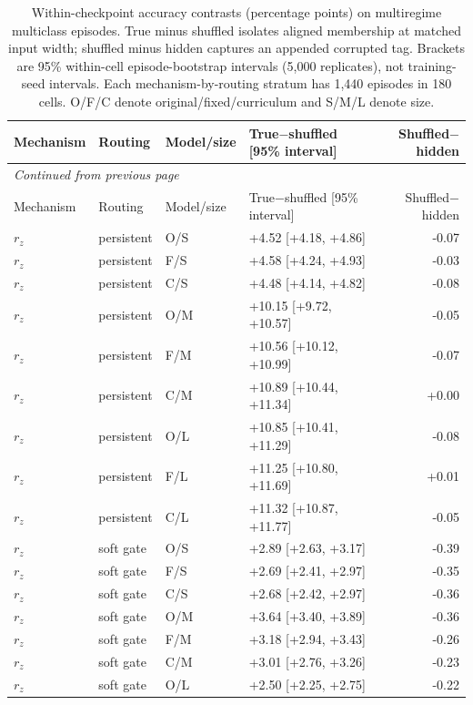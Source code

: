 \begin{longtable}{@{}lllp{4.4cm}r@{}}
\caption{Within-checkpoint accuracy contrasts (percentage points) on multiregime multiclass episodes. True minus shuffled isolates aligned membership at matched input width; shuffled minus hidden captures an appended corrupted tag. Brackets are 95\% within-cell episode-bootstrap intervals (5,000 replicates), not training-seed intervals. Each mechanism-by-routing stratum has 1,440 episodes in 180 cells. O/F/C denote original/fixed/curriculum and S/M/L denote size.}\label{tab:tagaccuracy}\\
\toprule Mechanism & Routing & Model/size & True$-$shuffled [95\% interval] & Shuffled$-$hidden\\\midrule\endfirsthead
\multicolumn{5}{l}{\emph{Continued from previous page}}\\\toprule Mechanism & Routing & Model/size & True$-$shuffled [95\% interval] & Shuffled$-$hidden\\\midrule\endhead
\bottomrule\endfoot
$r_z$ & persistent & O/S & +4.52 [+4.18, +4.86] & -0.07\\
$r_z$ & persistent & F/S & +4.58 [+4.24, +4.93] & -0.03\\
$r_z$ & persistent & C/S & +4.48 [+4.14, +4.82] & -0.08\\
$r_z$ & persistent & O/M & +10.15 [+9.72, +10.57] & -0.05\\
$r_z$ & persistent & F/M & +10.56 [+10.12, +10.99] & -0.07\\
$r_z$ & persistent & C/M & +10.89 [+10.44, +11.34] & +0.00\\
$r_z$ & persistent & O/L & +10.85 [+10.41, +11.29] & -0.08\\
$r_z$ & persistent & F/L & +11.25 [+10.80, +11.69] & +0.01\\
$r_z$ & persistent & C/L & +11.32 [+10.87, +11.77] & -0.05\\
\midrule
$r_z$ & soft gate & O/S & +2.89 [+2.63, +3.17] & -0.39\\
$r_z$ & soft gate & F/S & +2.69 [+2.41, +2.97] & -0.35\\
$r_z$ & soft gate & C/S & +2.68 [+2.42, +2.97] & -0.36\\
$r_z$ & soft gate & O/M & +3.64 [+3.40, +3.89] & -0.36\\
$r_z$ & soft gate & F/M & +3.18 [+2.94, +3.43] & -0.26\\
$r_z$ & soft gate & C/M & +3.01 [+2.76, +3.26] & -0.23\\
$r_z$ & soft gate & O/L & +2.50 [+2.25, +2.75] & -0.22\\

\end{longtable}
